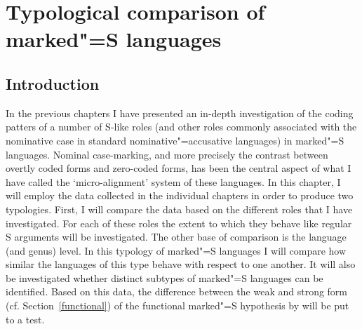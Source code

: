 
\chapter{Typological comparison of marked"=S languages}\label{typology}

\section{Introduction}

In the previous chapters I have presented an in-depth investigation of the coding patters of a number of S-like roles (and other roles commonly associated with the nominative case in standard nominative"=accusative languages) in marked"=S languages. 
Nominal case-marking, and more precisely the contrast between overtly coded forms and zero-coded forms, has been the central aspect of what I have called the `micro-alignment' system of these languages.
In this chapter, I will employ the data collected in the individual chapters in order to produce two typologies. 
First, I will compare the data based on the different roles that I have investigated. 
For each of these roles the extent to which they behave like regular S arguments will be investigated.
The other base of comparison is the language (and genus) level. 
In this typology of marked"=S languages I will compare how similar the languages of this type behave with respect to one another. 
It will also be investigated whether distinct subtypes of marked"=S languages can be identified.
Based on this data, %
the difference between the weak and strong form (cf. Section~\ref{functional}) of the functional marked"=S hypothesis by \citet{Koenig:2006} will be put to a test.

